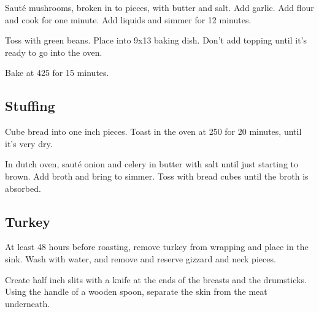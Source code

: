 \begin{recipe}
Sauté mushrooms, broken in to pieces, with butter and salt. Add garlic. Add flour and cook for one minute. Add liquids and simmer for 12 minutes.

Toss with green beans. Place into 9x13 baking dish. Don't add topping until it's ready to go into the oven.

Bake at 425 for 15 minutes.

\subsection{Stuffing}



Cube bread into one inch pieces. Toast in the oven at 250\degree{} for 20 minutes, until it's very dry.



In dutch oven, sauté onion and celery in butter with salt until just starting to brown. Add broth and bring to simmer. Toss with bread cubes until the broth is absorbed.

\subsection{Turkey}



At least 48 hours before roasting, remove turkey from wrapping and place in the sink. Wash with water, and remove and reserve gizzard and neck pieces.

Create half inch slits with a knife at the ends of the breasts and the drumsticks. Using the handle of a wooden spoon, separate the skin from the meat underneath.


\end{recipe}

